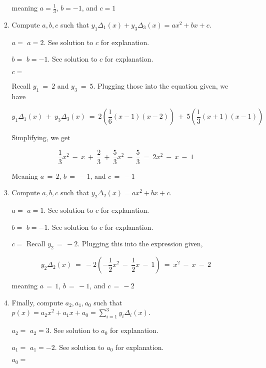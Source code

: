 \documentclass[11pt, preview]{standalone} %
\begin{document}
\begin{enumerate}
\begin{enumerate}
\begin{Freeform}{1}
 meaning $a = \frac{1}{3}$, $b = -1$, and $c = 1$

 \end{Freeform}

\item Compute $a,b,c$ such that $y_1\Delta_1(x) + y_3\Delta_3(x) = a x^2+b x+c$.
\begin{Freeform}{2}
$a = $ %
\Solution $a = 2$. See solution to $c$ for explanation.
\end{Freeform}
\begin{Freeform}{-1}
$b = $ %
\Solution $b = -1$. See solution to $c$ for explanation.
\end{Freeform}
\begin{Freeform}{-1}
$c = $ %

\Solution Recall $y_1\ =\ 2$ and $y_3\ =\ 5$. Plugging those into the equation given, we have 

$$y_1 \Delta_1(x)\ +\ y_3\Delta_3(x)\ =\ 2 \left(\frac{1}{6} (x - 1) (x - 2)\right)\ +\ 5 \left(\frac{1}{3}(x + 1)(x - 1)\right) $$

Simplifying, we get 

$$\frac{1}{3} x^2\ -\ x\ +\ \frac{2}{3}\ +\ \frac{5}{3} x^2\ -\ \frac{5}{3}\ =\ 2x^2\ -\ x\ -\ 1$$

Meaning $a\, =\, 2$, $b\, =\, -1$, and $c\, =\, -1$

\end{Freeform}

\item Compute $a,b,c$ such that $y_2\Delta_2(x) = a x^2 + b x + c$.
\begin{Freeform}{1}
$a = $ %
\Solution $a = 1$. See solution to $c$ for explanation.
\end{Freeform}
\begin{Freeform}{-1}
$b = $ %
\Solution $b = -1$. See solution to $c$ for explanation.
\end{Freeform}
\begin{Freeform}{-2}
$c = $ %
\Solution Recall $y_2\, =\, -2$. Plugging this into the expression given, 

$$y_2 \Delta_2(x)\ =\ -2\left(-\frac{1}{2} x^2\ -\ \frac{1}{2} x\ -\ 1\right)\ =\ x^2\ -\ x\ -\ 2$$

meaning $a\, =\, 1$, $b\, =\, -1$, and $c\, =\, -2$

\end{Freeform}

\item Finally, compute $a_2, a_1, a_0$ such that $p(x) = a_2 x^2 + a_1 x + a_0 = \sum_{i = 1}^{3}{y_i \Delta_i(x)}$.
\begin{Freeform}{3}
$a_2 =$
\Solution $a_2 = 3$. See solution to $a_0$ for explanation.
\end{Freeform}
\begin{Freeform}{-2}
$a_1 =$
\Solution $a_1 = -2$. See solution to $a_0$ for explanation.
\end{Freeform}
\begin{Freeform}{-3}
$a_0 =$


\end{Freeform}
\end{enumerate}
\end{enumerate}
\end{document}
